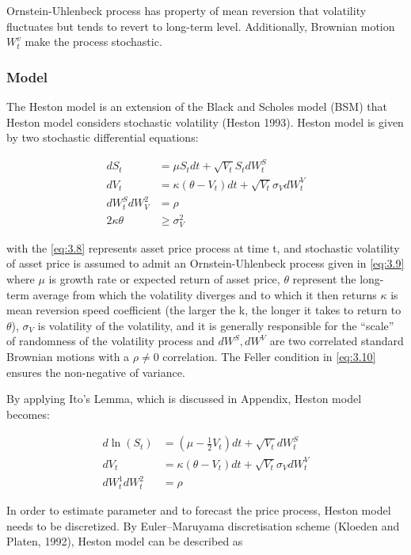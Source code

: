 \documentclass[12pt,a4paper]{article}
\numberwithin{equation}{section}
\begin{document}
Ornstein-Uhlenbeck process has property of mean reversion that volatility fluctuates but tends to revert to long-term level. Additionally, Brownian motion $W_t^v$ make the process stochastic.


\subsubsection{Model}
The Heston model is an extension of the Black and Scholes model (BSM) that Heston model considers stochastic volatility (Heston 1993). Heston model is given by two stochastic differential equations:

\begin{align}
dS_t &= \mu S_t dt + \sqrt{V_t} S_t dW_t^S \label{eq:3.8} \\[0.6em]
dV_t &= \kappa (\theta - V_t) dt + \sqrt{V_t} \sigma_V dW_t^V \label{eq:3.9} \\[0.6em]
dW_t^S dW_V^2 &= \rho \\[0.6em]
2\kappa \theta &\ge \sigma_V^2 \label{eq:3.10}
\end{align}

with the \eqref{eq:3.8} represents asset price process at time t, and stochastic volatility of asset price is assumed to admit an Ornstein-Uhlenbeck process given in \eqref{eq:3.9} where $\mu$ is growth rate or expected return of asset price, $\theta$ represent the long-term average from which the volatility diverges and to which it then returns $\kappa$ is mean reversion speed coefficient (the larger the k, the longer it takes to return to $\theta$), $\sigma_V$ is volatility of the volatility, and it is generally responsible for the “scale” of randomness of the volatility process and $dW^S, dW^V$ are two correlated standard Brownian motions with a $\rho \neq 0$ correlation. The Feller condition in \eqref{eq:3.10} ensures the non-negative of variance.

By applying Ito's Lemma, which is discussed in Appendix, Heston model becomes:

\begin{align*}
d \ln(S_t) &= \left( \mu - \frac{1}{2}V_t \right) dt + \sqrt{V_t} dW_t^S \\[0.6em] 
dV_t &= \kappa (\theta - V_t) dt + \sqrt{V_t} \sigma_V dW_t^V \\[0.6em] 
dW_t^1 dW_t^2 &= \rho
\end{align*}

In order to estimate parameter and to forecast the price process, Heston model needs to be discretized. By Euler–Maruyama discretisation scheme (Kloeden and Platen, 1992), Heston model can be described as
\end{document}
